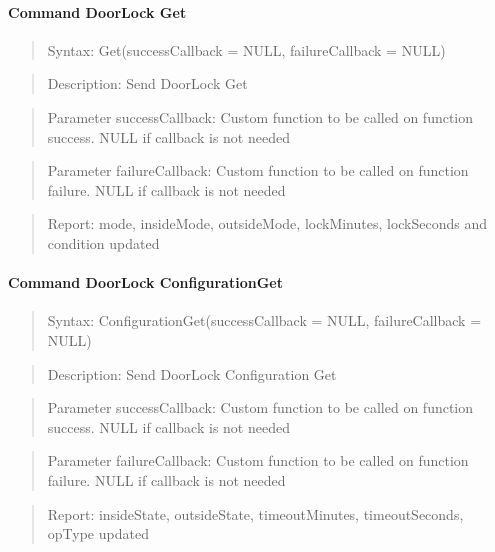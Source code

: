 \paragraph{Command DoorLock Get}
\begin{quote}Syntax: Get(successCallback = NULL, failureCallback = NULL)\end{quote}
\begin{quote}Description: Send DoorLock Get\end{quote}
\begin{quote}Parameter successCallback: Custom function to be called on function success. NULL if callback is not needed\end{quote}
\begin{quote}Parameter failureCallback: Custom function to be called on function failure. NULL if callback is not needed\end{quote}
\begin{quote}Report: mode, insideMode, outsideMode, lockMinutes, lockSeconds and condition updated\end{quote}

\paragraph{Command DoorLock ConfigurationGet}
\begin{quote}Syntax: ConfigurationGet(successCallback = NULL, failureCallback = NULL)\end{quote}
\begin{quote}Description: Send DoorLock Configuration Get\end{quote}
\begin{quote}Parameter successCallback: Custom function to be called on function success. NULL if callback is not needed\end{quote}
\begin{quote}Parameter failureCallback: Custom function to be called on function failure. NULL if callback is not needed\end{quote}
\begin{quote}Report: insideState, outsideState, timeoutMinutes, timeoutSeconds, opType updated\end{quote}

